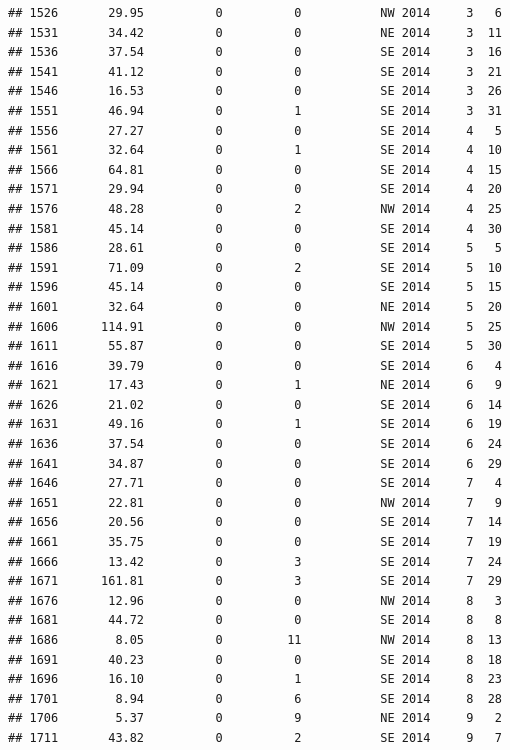 \documentclass[
]{article}
\begin{document}
\begin{verbatim}
## 1526       29.95          0          0           NW 2014     3   6
## 1531       34.42          0          0           NE 2014     3  11
## 1536       37.54          0          0           SE 2014     3  16
## 1541       41.12          0          0           SE 2014     3  21
## 1546       16.53          0          0           SE 2014     3  26
## 1551       46.94          0          1           SE 2014     3  31
## 1556       27.27          0          0           SE 2014     4   5
## 1561       32.64          0          1           SE 2014     4  10
## 1566       64.81          0          0           SE 2014     4  15
## 1571       29.94          0          0           SE 2014     4  20
## 1576       48.28          0          2           NW 2014     4  25
## 1581       45.14          0          0           SE 2014     4  30
## 1586       28.61          0          0           SE 2014     5   5
## 1591       71.09          0          2           SE 2014     5  10
## 1596       45.14          0          0           SE 2014     5  15
## 1601       32.64          0          0           NE 2014     5  20
## 1606      114.91          0          0           NW 2014     5  25
## 1611       55.87          0          0           SE 2014     5  30
## 1616       39.79          0          0           SE 2014     6   4
## 1621       17.43          0          1           NE 2014     6   9
## 1626       21.02          0          0           SE 2014     6  14
## 1631       49.16          0          1           SE 2014     6  19
## 1636       37.54          0          0           SE 2014     6  24
## 1641       34.87          0          0           SE 2014     6  29
## 1646       27.71          0          0           SE 2014     7   4
## 1651       22.81          0          0           NW 2014     7   9
## 1656       20.56          0          0           SE 2014     7  14
## 1661       35.75          0          0           SE 2014     7  19
## 1666       13.42          0          3           SE 2014     7  24
## 1671      161.81          0          3           SE 2014     7  29
## 1676       12.96          0          0           NW 2014     8   3
## 1681       44.72          0          0           SE 2014     8   8
## 1686        8.05          0         11           NW 2014     8  13
## 1691       40.23          0          0           SE 2014     8  18
## 1696       16.10          0          1           SE 2014     8  23
## 1701        8.94          0          6           SE 2014     8  28
## 1706        5.37          0          9           NE 2014     9   2
## 1711       43.82          0          2           SE 2014     9   7

\end{verbatim}
\end{document}
